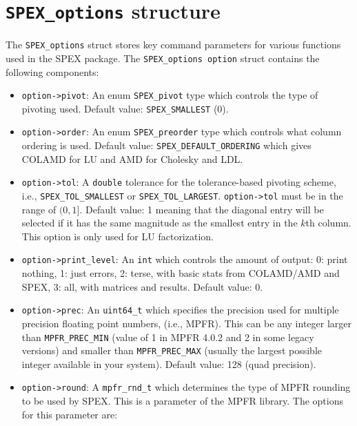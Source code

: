\documentclass[12pt,oneside]{book}
\theoremstyle{definition}
\begin{document}
\section{\texttt{SPEX\_options} structure} \label{ss:SPEX_options_struct}
The \verb|SPEX_options| struct stores key command parameters for various
functions used in the SPEX package. The \verb|SPEX_options option| struct
contains the following components:

\begin{itemize}
    \item \verb|option->pivot|: An enum \verb|SPEX_pivot| type which controls the type of pivoting used. Default value: \verb|SPEX_SMALLEST| (0).

    \item \verb|option->order|: An enum \verb|SPEX_preorder| type which controls what column ordering is used. Default value: \verb|SPEX_DEFAULT_ORDERING| which gives COLAMD for LU and AMD for Cholesky and LDL.

    \item \verb|option->tol|: A \verb|double| tolerance for the tolerance-based pivoting scheme, i.e., \newline \verb|SPEX_TOL_SMALLEST| or \verb|SPEX_TOL_LARGEST|. \verb|option->tol| must be in the range of $(0,1]$. Default value: 1 meaning that the diagonal entry will be selected if it has the same magnitude as the smallest entry in the $k$th column.  This option is only used for LU factorization.

    \item \verb|option->print_level|: An \verb|int| which controls the amount of output: 0: print nothing, 1: just errors, 2: terse, with basic stats from COLAMD/AMD and SPEX, 3: all, with matrices and results. Default value: 0.

    \item  \verb|option->prec|: An \verb|uint64_t| which specifies the precision used for multiple precision floating point numbers, (i.e., MPFR). This can be any integer larger than \verb|MPFR_PREC_MIN| (value of 1 in MPFR 4.0.2 and 2 in some legacy versions) and smaller than \verb|MPFR_PREC_MAX| (usually the largest possible integer available in your system). Default value: 128 (quad precision).

    \item \verb|option->round|: A \verb|mpfr_rnd_t| which determines the type of MPFR rounding to be used by SPEX. This is a parameter of the MPFR library. The options for this parameter are:


\end{itemize}
\end{document}
